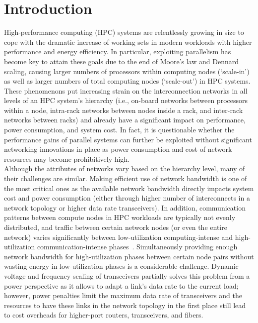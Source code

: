\section{Introduction}
High-performance computing (HPC) systems are relentlessly growing in size to cope with the dramatic increase of working sets in modern workloads with higher performance and energy efficiency. In particular, exploiting parallelism has become key to attain these goals due to the end of Moore's law and Dennard scaling, causing larger numbers of processors within computing nodes (`scale-in') as well as larger numbers of total computing nodes (`scale-out') in HPC systems. These phenomenons put increasing strain on the interconnection networks in all levels of an HPC system's hierarchy (i.e., on-board networks between processors within a node, intra-rack networks between nodes inside a rack, and inter-rack networks between racks) and already have a significant impact on performance, power consumption, and system cost. In fact, it is questionable whether the performance gains of parallel systems can further be exploited without significant networking innovations in place as power consumption and cost of network resources may become prohibitively high. \\
Although the attributes of networks vary based on the hierarchy level, many of their challenges are similar. Making efficient use of network bandwidth is one of the most critical ones as the available network bandwidth directly impacts system cost and power consumption (either through higher number of interconnects in a network topology or higher data rate transceivers). In addition, communication patterns between compute nodes in HPC workloads are typically not evenly distributed, and traffic between certain network nodes (or even the entire network) varies significantly between low-utilization computing-intense and high-utilization communication-intense phases~\cite{gratz2010realistic}. Simultaneously providing enough network bandwidth for high-utilization phases between certain node pairs without wasting energy in low-utilization phases is a considerable challenge. Dynamic voltage and frequency scaling of transceivers partially solves this problem from a power perspective as it allows to adapt a link's data rate to the current load; however, power penalties limit the maximum data rate of transceivers and the resources to have these links in the network topology in the first place still lead to cost overheads for higher-port routers, transceivers, and fibers.  \\
